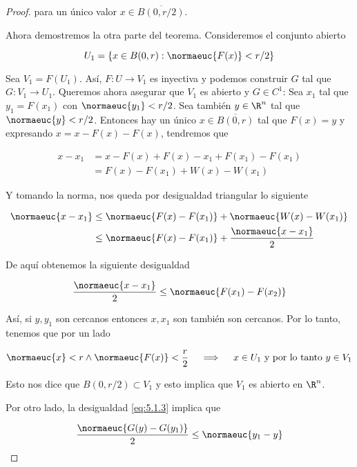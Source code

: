 \begin{proof}
    \noindent para un único valor $x \in \overline{B(0,r/2)}$.
    
    Ahora demostremos la otra parte del teorema. Consideremos el conjunto abierto
    
    \[
    U_1 = \{ x \in B(0,r) : \normaeuc{F(x)} < r/2\}
    \]
    
    Sea $V_1 = F(U_1)$. Así, $F: U \rightarrow V_1$ es inyectiva y podemos construir $G$ tal que $G: V_1 \rightarrow U_1$. Queremos ahora asegurar que $V_1$ es abierto y $G \in C^1$: Sea $x_1$ tal que $y_1 = F(x_1)$ con $\normaeuc{y_1} < r/2$. Sea también $y \in \R^n$ tal que $\normaeuc{y} < r/2$. Entonces hay un único $x \in \overline{B(0,r)}$ tal que $F(x) = y$ y expresando $x = x - F(x) - F(x)$, tendremos que
    
    \begin{align*}
        x - x_1 &= x - F(x) + F(x) - x_1 + F(x_1) - F(x_1) \\
            &= F(x) - F(x_1) + W(x) - W(x_1)
    \end{align*}
    
    Y tomando la norma, nos queda por desigualdad triangular lo siguiente
    
    \begin{align*}
        \normaeuc{x - x_1} &\leq \normaeuc{F(x) - F(x_1)} + \normaeuc{W(x) - W(x_1)} \\
            &\leq \normaeuc{F(x) - F(x_1)} + \frac{\normaeuc{x - x_1}}{2}
    \end{align*}
    
    De aquí obtenemos la siguiente desigualdad
    
    \begin{equation}\label{eq:5.1.3}
        \frac{\normaeuc{x-x_1}}{2} \leq \normaeuc{F(x_1) - F(x_2)}
    \end{equation}
    
    Así, si $y, y_1$ son cercanos entonces $x, x_1$ son también son cercanos. Por lo tanto, tenemos que por un lado
    
    \[
    \normaeuc{x} < r \wedge \normaeuc{F(x)} < \frac{r}{2} \quad \implies \quad x \in U_1 \text{~y por lo tanto $y \in V_1$}
    \]
    
    Esto nos dice que $B(0, r/2) \subset V_1$ y esto implica que $V_1$ es abierto en $\R^n$.
    
    Por otro lado, la desigualdad \ref{eq:5.1.3} implica que
    
    \[
    \frac{\normaeuc{G(y) - G(y_1)}}{2} \leq \normaeuc{y_1 - y}
    \]
    

\end{proof}
